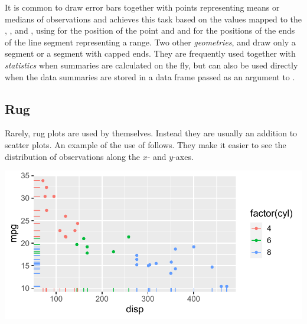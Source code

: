 \documentclass[krantz2]{krantz}\usepackage{knitr}
\begin{document}
It is common to draw error bars together with points representing means or medians of observations and  achieves this task based on the values mapped to the , ,  and , using  for the position of the point and  and  for the positions of the ends of the line segment representing a range. Two other \emph{geometries},  and   draw only a segment or a segment with capped ends. They are frequently used together with \emph{statistics} when summaries are calculated on the fly, but can also be used directly when the data summaries are stored in a data frame passed as an argument to .

\subsection{Rug}\label{sec:plot:rug}

Rarely, rug plots are used by themselves. Instead they are usually an addition to scatter plots. An example of the use of  follows. They make it easier to see the distribution of observations
along the $x$- and $y$-axes.

\begin{knitrout}\footnotesize
{}\color{fgcolor}\begin{kframe}
\begin{alltt}
\hlstd{(} 
       \hlstd{(}     \hlstd{=}  \hlopt{+}
  \hlstd{()} \hlopt{+}
  \hlstd{()}
\end{alltt}
\end{kframe}

{\centering \includegraphics[width=.7\textwidth]{figure/pos-rug-plot-01-1}

}



\end{knitrout}
\end{document}
